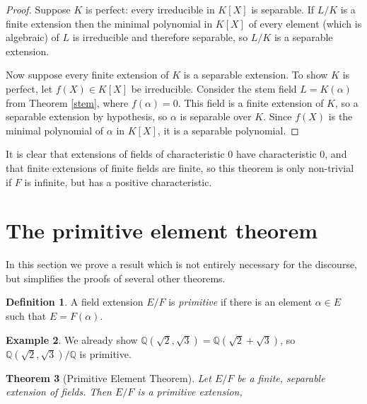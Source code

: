 \documentclass[12pt]{report}
\newtheorem{theorem}{Theorem}[section]
\theoremstyle{definition}
\newtheorem{definition}[theorem]{Definition}
\newtheorem{example}[theorem]{Example}
\newcommand{\QQ}{\mathbb{Q}}
\begin{document}
\begin{proof}
	Suppose $K$ is perfect: every irreducible in $K[X]$ is separable. If $L/K$ is a finite extension then the minimal polynomial in $K[X]$ of every element (which is algebraic) of $L$ is irreducible and therefore separable, so $L/K$ is a separable extension.

	Now suppose every finite extension of $K$ is a separable extension. To show $K$ is perfect, let $f(X) \in K[X]$ be irreducible. Consider the stem field $L = K(\alpha)$ from Theorem \ref{stem}, where $f(\alpha) = 0$. This field is a finite extension of $K$, so a separable extension by hypothesis, so $\alpha$ is separable over $K$. Since $f(X)$ is the minimal polynomial of $\alpha$ in $K[X]$, it is a separable polynomial.
\end{proof}

It is clear that extensions of fields of characteristic 0 have characteristic 0, and that finite extensions of finite fields are finite, so this theorem is only non-trivial if $F$ is infinite, but has a positive characteristic.

\section{The primitive element theorem}

In this section we prove a result which is not entirely necessary for the discourse, but simplifies the proofs of several other theorems.

\begin{definition}
	A field extension $E/F$ is \emph{primitive} if there is an element $\alpha\in E$ such that $E=F(\alpha)$.
\end{definition}

\begin{example}
	We already show $\QQ(\sqrt{2},\sqrt{3})=\QQ(\sqrt{2}+\sqrt{3})$, so $\QQ(\sqrt{2},\sqrt{3})/\QQ$ is primitive.
\end{example}

\begin{theorem}[Primitive Element Theorem]\label{primitive}
	Let $E/F$ be a finite, separable extension of fields. Then $E/F$ is a primitive extension,
\end{theorem}
\end{document}
